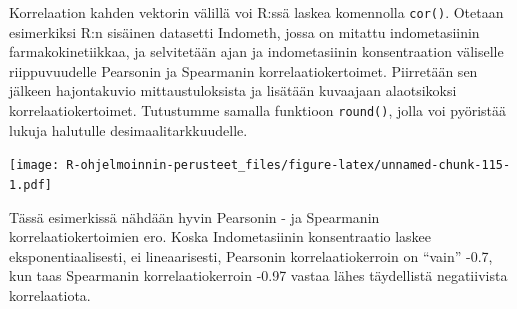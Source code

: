 \documentclass[
]{book}
\newenvironment{Shaded}{\begin{snugshade}}{\end{snugshade}}
\newcommand{\AttributeTok}[1]{\textcolor[rgb]{0.77,0.63,0.00}{#1}}
\newcommand{\CommentTok}[1]{\textcolor[rgb]{0.56,0.35,0.01}{\textit{#1}}}
\newcommand{\DecValTok}[1]{\textcolor[rgb]{0.00,0.00,0.81}{#1}}
\newcommand{\FunctionTok}[1]{\textcolor[rgb]{0.00,0.00,0.00}{#1}}
\newcommand{\NormalTok}[1]{#1}
\newcommand{\OtherTok}[1]{\textcolor[rgb]{0.56,0.35,0.01}{#1}}
\newcommand{\SpecialCharTok}[1]{\textcolor[rgb]{0.00,0.00,0.00}{#1}}
\newcommand{\StringTok}[1]{\textcolor[rgb]{0.31,0.60,0.02}{#1}}
\begin{document}
Korrelaation kahden vektorin välillä voi R:ssä laskea komennolla \texttt{cor()}. Otetaan esimerkiksi R:n sisäinen datasetti Indometh, jossa on mitattu indometasiinin farmakokinetiikkaa, ja selvitetään ajan ja indometasiinin konsentraation väliselle riippuvuudelle Pearsonin ja Spearmanin korrelaatiokertoimet. Piirretään sen jälkeen hajontakuvio mittaustuloksista ja lisätään kuvaajaan alaotsikoksi korrelaatiokertoimet. Tutustumme samalla funktioon \texttt{round()}, jolla voi pyöristää lukuja halutulle desimaalitarkkuudelle.

\begin{Shaded}
\end{Shaded}

\texttt{[image: R-ohjelmoinnin-perusteet\_files/figure-latex/unnamed-chunk-115-1.pdf]}

Tässä esimerkissä nähdään hyvin Pearsonin - ja Spearmanin korrelaatiokertoimien ero. Koska Indometasiinin konsentraatio laskee eksponentiaalisesti, ei lineaarisesti, Pearsonin korrelaatiokerroin on ``vain'' -0.7, kun taas Spearmanin korrelaatiokerroin -0.97 vastaa lähes täydellistä negatiivista korrelaatiota.
\end{document}
